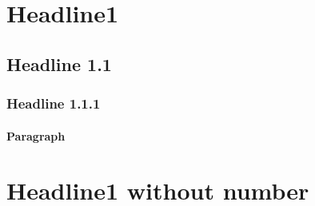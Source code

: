 \section{Headline1}

\subsection{Headline 1.1}

\subsubsection{Headline 1.1.1}

\paragraph{Paragraph}

\section*{Headline1 without number}

